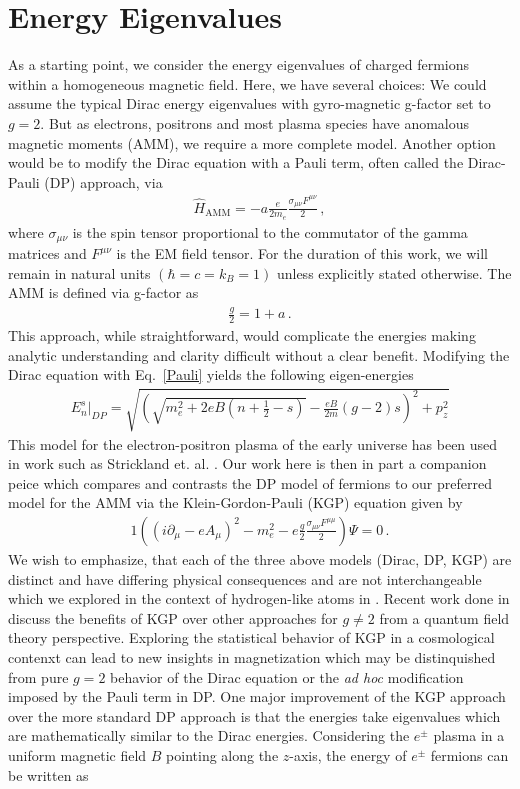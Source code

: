 \documentclass[Universe,article,submit,moreauthors,pdftex]{Definitions/mdpi}
\newcommand*{\req}[1]{Eq.~{\eqref{#1}}}
\begin{document}
\section{Energy Eigenvalues}\label{sec:energy}
\noindent As a starting point, we consider the energy eigenvalues of charged fermions within a homogeneous magnetic field. Here, we have several choices: We could assume the typical Dirac energy eigenvalues with gyro-magnetic g-factor set to $g=2$. But as electrons, positrons and most plasma species have anomalous magnetic moments (AMM), we require a more complete model. Another option would be to modify the Dirac equation with a Pauli term, often called the Dirac-Pauli (DP) approach, via
\begin{align}
  \label{Pauli} \hat{H}_{\mathrm{AMM}} = -a\frac{e}{2m_{e}}\frac{\sigma_{\mu\nu}F^{\mu\nu}}{2}\,,
\end{align}
where $\sigma_{\mu\nu}$ is the spin tensor proportional to the commutator of the gamma matrices and $F^{\mu\nu}$ is the EM field tensor. For the duration of this work, we will remain in natural units $(\hbar=c=k_{B}=1)$ unless explicitly stated otherwise. The AMM is defined via g-factor as
\begin{align}
  \label{AMM} \frac{g}{2}=1+a\,.
\end{align}
This approach, while straightforward, would complicate the energies making analytic understanding and clarity difficult without a clear benefit. Modifying the Dirac equation with \req{Pauli} yields the following eigen-energies
\begin{align}
  \label{DPEnergy} E_{n}^{s}\vert_{DP}=\sqrt{\left(\sqrt{m_{e}^{2}+2eB\left(n+\frac{1}{2}-s\right)}-\frac{eB}{2m}(g-2)s\right)^{2}+p_{z}^{2}}
\end{align}
This model for the electron-positron plasma of the early universe has been used in work such as Strickland et. al. \cite{Strickland:2012vu}. Our work here is then in part a companion peice which compares and contrasts the DP model of fermions to our preferred model for the AMM via the Klein-Gordon-Pauli (KGP) equation given by
\begin{alignat}{1}
  \label{KGP} \left(\left(i\partial_{\mu}-eA_{\mu}\right)^{2}-m_{e}^{2}-e\frac{g}{2}\frac{\sigma_{\mu\nu}F^{\mu\mu}}{2}\right)\Psi=0\,.
\end{alignat}
We wish to emphasize, that each of the three above models (Dirac, DP, KGP) are distinct and have differing physical consequences and are not interchangeable which we explored in the context of hydrogen-like atoms in \cite{Steinmetz:2018ryf}. Recent work done in \cite{Rafelski:2022bsv} discuss the benefits of KGP over other approaches for $g\neq2$ from a quantum field theory perspective. Exploring the statistical behavior of KGP in a cosmological contenxt can lead to new insights in magnetization which may be distinquished from pure $g=2$ behavior of the Dirac equation or the \emph{ad hoc} modification imposed by the Pauli term in DP. One major improvement of the KGP approach over the more standard DP approach is that the energies take eigenvalues which are mathematically similar to the Dirac energies. Considering the $e^\pm$ plasma in a uniform magnetic field $B$ pointing along the $z$-axis, the energy of $e^\pm$ fermions can be written as
\end{document}
